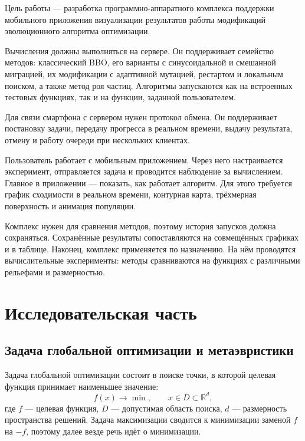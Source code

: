 \documentclass[14pt, a4paper]{extarticle}
\begin{document}
Цель работы --- разработка программно-аппаратного комплекса поддержки мобильного
приложения визуализации результатов работы модификаций эволюционного алгоритма
оптимизации. 

Вычисления должны выполняться на сервере. Он поддерживает семейство методов:
классический BBO, его варианты с синусоидальной и смешанной миграцией, их
модификации с адаптивной мутацией, рестартом и локальным поиском, а также метод
роя частиц. Алгоритмы запускаются как на встроенных тестовых функциях, так и на
функции, заданной пользователем.

Для связи смартфона с сервером нужен протокол обмена. Он поддерживает постановку
задачи, передачу прогресса в реальном времени, выдачу результата, отмену и работу
очереди при нескольких клиентах.

Пользователь работает с мобильным приложением. Через него настраивается
эксперимент, отправляется задача и проводится наблюдение за вычислением. Главное в приложении --- показать, как работает алгоритм. Для этого требуется
график сходимости в реальном времени, контурная карта, трёхмерная поверхность и
анимация популяции.

Комплекс нужен для сравнения методов, поэтому история запусков должна сохраняться.
Сохранённые результаты сопоставляются на совмещённых графиках и в таблице. Наконец, комплекс применяется по назначению. На нём проводятся вычислительные
эксперименты: методы сравниваются на функциях с различными рельефами и размерностью.

\section{Исследовательская часть}\label{sec:research}

\subsection{Задача глобальной оптимизации и метаэвристики}
\label{subsec:opt-problem}

Задача глобальной оптимизации состоит в поиске точки, в которой целевая функция
принимает наименьшее значение:
\begin{equation}\label{eq:global-min}
  f(x) \to \min, \qquad x \in D \subset \mathbb{R}^{d},
\end{equation}
где $f$ --- целевая функция, $D$ --- допустимая область поиска, $d$ ---
размерность пространства решений. Задача максимизации сводится к минимизации
заменой $f$ на $-f$, поэтому далее везде речь идёт о минимизации.
\end{document}
